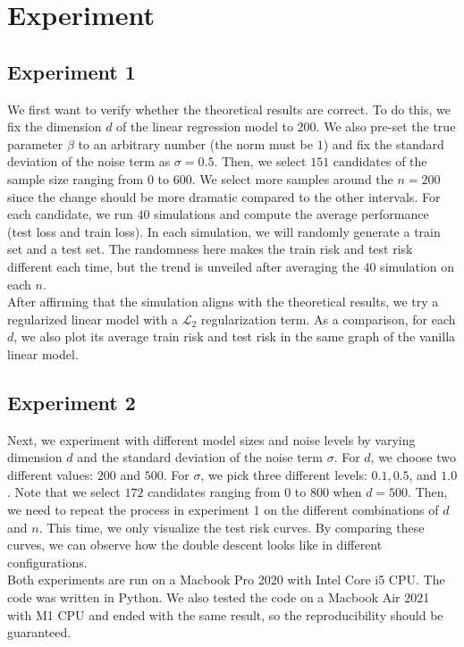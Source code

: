 \documentclass{article}
\begin{document}
\section{Experiment} \label{Experiment}
\subsection{Experiment 1}
We first want to verify whether the theoretical results are correct. To do this, we fix the dimension $d$ of the linear regression model to $200$. We also pre-set the true parameter $\beta$ to an arbitrary number (the norm must be $1$) and fix the standard deviation of the noise term as $\sigma = 0.5$. Then, we select $151$ candidates of the sample size ranging from $0$ to $600$. We select more samples around the $n = 200$ since the change should be more dramatic compared to the other intervals. For each candidate, we run $40$ simulations and compute the average performance (test loss and train loss). In each simulation, we will randomly generate a train set and a test set. The randomness here makes the train risk and test risk different each time, but the trend is unveiled after averaging the $40$ simulation on each $n$.\\

\vspace{-4mm}
After affirming that the simulation aligns with the theoretical results, we try a regularized linear model with a $\mathcal{L}_2$ regularization term. As a comparison, for each $d$, we also plot its average train risk and test risk in the same graph of the vanilla linear model.

\subsection{Experiment 2}
Next, we experiment with different model sizes and noise levels by varying dimension $d$ and the standard deviation of the noise term $\sigma$. For $d$, we choose two different values: $200$ and $500$. For $\sigma$, we pick three different levels: $0.1, 0.5$, and $1.0$. Note that we select $172$ candidates ranging from $0$ to $800$ when $d = 500$. Then, we need to repeat the process in experiment 1 on the different combinations of $d$ and $n$. This time, we only visualize the test risk curves. By comparing these curves, we can observe how the double descent looks like in different configurations.\\

\vspace{-4mm}
Both experiments are run on a Macbook Pro 2020 with Intel Core i5 CPU. The code was written in Python. We also tested the code on a Macbook Air 2021 with M1 CPU and ended with the same result, so the reproducibility should be guaranteed.
\end{document}

